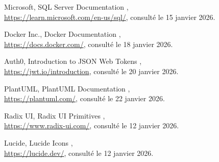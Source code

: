 \begin{enumerate}[label={[\arabic*]}]
    \item Microsoft, \og SQL Server Documentation \fg{},\\
    \url{https://learn.microsoft.com/en-us/sql/}, consulté le 15 janvier 2026.

    \item Docker Inc., \og Docker Documentation \fg{},\\
    \url{https://docs.docker.com/}, consulté le 18 janvier 2026.

    \item Auth0, \og Introduction to JSON Web Tokens \fg{},\\
    \url{https://jwt.io/introduction}, consulté le 20 janvier 2026.

    \item PlantUML, \og PlantUML Documentation \fg{},\\
    \url{https://plantuml.com/}, consulté le 22 janvier 2026.

    \item Radix UI, \og Radix UI Primitives \fg{},\\
    \url{https://www.radix-ui.com/}, consulté le 12 janvier 2026.

    \item Lucide, \og Lucide Icons \fg{},\\
    \url{https://lucide.dev/}, consulté le 12 janvier 2026.
\end{enumerate}

\clearpage
